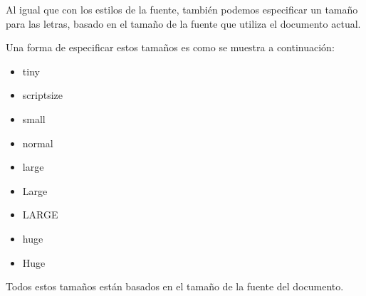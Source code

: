 \documentclass[letterpaper,11pt]{article}
\begin{document}
Al igual que con los estilos de la fuente, también podemos especificar un tamaño para las letras, basado en el tamaño de la fuente que utiliza el documento actual.

Una forma de especificar estos tamaños es como se muestra a continuación:

\begin{itemize}

\item {\tiny tiny}

\item {\scriptsize scriptsize}

\item {\small small}

\item {\normalsize normal}

\item {\large large}

\item {\Large Large}

\item {\LARGE LARGE}

\item {\huge huge}

\item {\Huge Huge}

\end{itemize}

Todos estos tamaños están basados en el tamaño de la fuente del documento.
\end{document}
